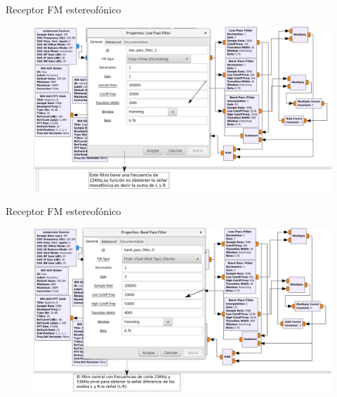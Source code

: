 \begin{frame}{Receptor FM estereofónico}

\begin{figure}[H]
\centering
\vspace{-3mm}
\includegraphics[width=\textwidth]{parte3/lab9/pdf/lab9_2.pdf}
\end{figure}

\end{frame}

\begin{frame}{Receptor FM estereofónico}

\begin{figure}[H]
\centering
\vspace{-3mm}
\includegraphics[width=\textwidth]{parte3/lab9/pdf/lab9_3.pdf}
\end{figure}

\end{frame}

